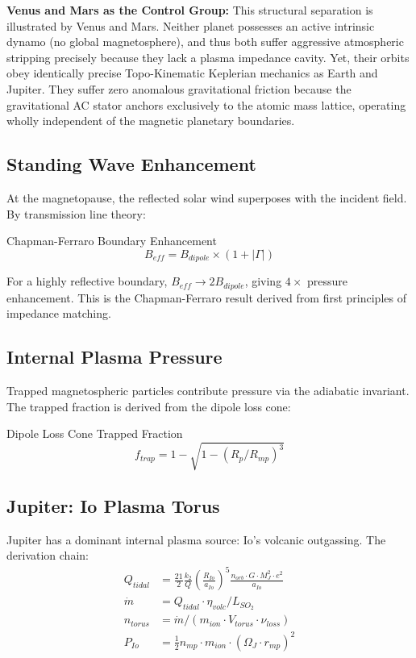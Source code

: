 \textbf{Venus and Mars as the Control Group:} This structural separation is illustrated by Venus and Mars. Neither planet possesses an active intrinsic dynamo (no global magnetosphere), and thus both suffer aggressive atmospheric stripping precisely because they lack a plasma impedance cavity. Yet, their orbits obey identically precise Topo-Kinematic Keplerian mechanics as Earth and Jupiter. They suffer zero anomalous gravitational friction because the gravitational AC stator anchors exclusively to the atomic mass lattice, operating wholly independent of the magnetic planetary boundaries.

\subsection{Standing Wave Enhancement}

At the magnetopause, the reflected solar wind superposes with the
incident field.  By transmission line theory:
\begin{resultbox}{Chapman-Ferraro Boundary Enhancement}
\begin{equation}
    B_{eff} = B_{dipole} \times (1 + |\Gamma|)
\end{equation}
\end{resultbox}
For a highly reflective boundary, $B_{eff} \to 2 B_{dipole}$, giving
$4\times$ pressure enhancement.  This is the Chapman-Ferraro result
derived from first principles of impedance matching.

\subsection{Internal Plasma Pressure}

Trapped magnetospheric particles contribute pressure via the adiabatic
invariant.  The trapped fraction is derived from the dipole loss cone:
\begin{resultbox}{Dipole Loss Cone Trapped Fraction}
\begin{equation}
    f_{trap} = 1 - \sqrt{1 - (R_p/R_{mp})^3}
\end{equation}
\end{resultbox}

\subsection{Jupiter: Io Plasma Torus}

Jupiter has a dominant internal plasma source: Io's volcanic
outgassing.  The derivation chain:
\begin{align}
    Q_{tidal} &= \frac{21}{2}\frac{k_2}{Q}\left(\frac{R_{Io}}{a_{Io}}\right)^5
    \frac{n_{orb} \cdot G \cdot M_J^2 \cdot e^2}{a_{Io}} \\
    \dot{m} &= Q_{tidal} \cdot \eta_{volc} / L_{SO_2} \\
    n_{torus} &= \dot{m} / (m_{ion} \cdot V_{torus} \cdot \nu_{loss}) \\
    P_{Io} &= \frac{1}{2} n_{mp} \cdot m_{ion} \cdot (\Omega_J \cdot r_{mp})^2
\end{align}

